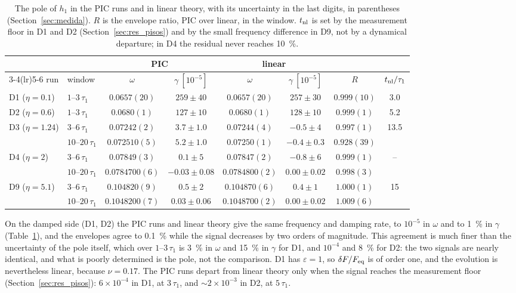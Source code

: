 \documentclass[11pt,a4paper]{article}
\begin{document}
\begin{table}[!htbp]
\centering
\small
\setlength{\tabcolsep}{3.5pt}
\begin{tabular}{llcccccc}
\toprule
 & & \multicolumn{2}{c}{PIC} & \multicolumn{2}{c}{linear} & & \\
\cmidrule(lr){3-4}\cmidrule(lr){5-6}
run & window & $\omega$ & $\gamma\ [10^{-5}]$ & $\omega$ & $\gamma\ [10^{-5}]$ & $R$ & $t_{\rm nl}/\tau_1$\\
\midrule
D1 ($\eta=0.1$) & $1$--$3\,\tau_1$ & $0.0657(20)$ & $259\pm40$ & $0.0657(20)$ & $257\pm30$ & $0.999(10)$ & 3.0\\
D2 ($\eta=0.6$) & $1$--$3\,\tau_1$ & $0.0680(1)$ & $127\pm10$ & $0.0680(1)$ & $128\pm10$ & $0.999(1)$ & 5.2\\
D3 ($\eta=1.24$) & $3$--$6\,\tau_1$ & $0.07242(2)$ & $3.7\pm1.0$ & $0.07244(4)$ & $-0.5\pm4$ & $0.997(1)$ & 13.5\\
 & $10$--$20\,\tau_1$ & $0.072510(5)$ & $5.2\pm1.0$ & $0.07250(1)$ & $-0.4\pm0.3$ & $0.928(39)$ & \\
D4 ($\eta=2$) & $3$--$6\,\tau_1$ & $0.07849(3)$ & $0.1\pm5$ & $0.07847(2)$ & $-0.8\pm6$ & $0.999(1)$ & --\\
 & $10$--$20\,\tau_1$ & $0.0784700(6)$ & $-0.03\pm0.08$ & $0.0784800(2)$ & $0.00\pm0.02$ & $0.998(3)$ & \\
D9 ($\eta=5.1$) & $3$--$6\,\tau_1$ & $0.104820(9)$ & $0.5\pm2$ & $0.104870(6)$ & $0.4\pm1$ & $1.000(1)$ & 15\\
 & $10$--$20\,\tau_1$ & $0.1048200(7)$ & $0.03\pm0.06$ & $0.1048700(2)$ & $0.00\pm0.02$ & $1.009(6)$ & \\
\bottomrule
\end{tabular}
\caption{The pole of $h_1$ in the PIC runs and in linear theory, with its uncertainty in
the last digits, in parentheses (Section~\ref{sec:medida}). $R$ is the envelope ratio,
PIC over linear, in the window. $t_{\rm nl}$ is set by the measurement floor in D1 and
D2 (Section~\ref{sec:res_pisos}) and by the small frequency difference in D9, not by a
dynamical departure; in D4 the residual never reaches \SI{10}{\%}.}
\label{tab:polos}
\end{table}

On the damped side (D1, D2) the PIC runs and linear theory give the same frequency and
damping rate, to $10^{-5}$ in $\omega$ and to \SI{1}{\%} in $\gamma$ (Table~\ref{tab:polos}),
and the envelopes agree to \SI{0.1}{\%} while the signal decreases by two orders of
magnitude. This agreement is much finer than the uncertainty of the pole itself, which
over $1$--$3\,\tau_1$ is \SI{3}{\%} in $\omega$ and \SI{15}{\%} in $\gamma$ for D1, and
$10^{-4}$ and \SI{8}{\%} for D2: the two signals are nearly identical, and what is poorly
determined is the pole, not the comparison. D1 has $\varepsilon=1$, so $\delta F/F_{\rm
eq}$ is of order one, and the evolution is nevertheless linear, because $\nu=0.17$. The
PIC runs depart from linear theory only when the signal reaches the measurement floor
(Section~\ref{sec:res_pisos}): $6\times10^{-4}$ in D1, at $3\,\tau_1$, and $\sim2\times10^{-3}$
in D2, at $5\,\tau_1$.
\end{document}
